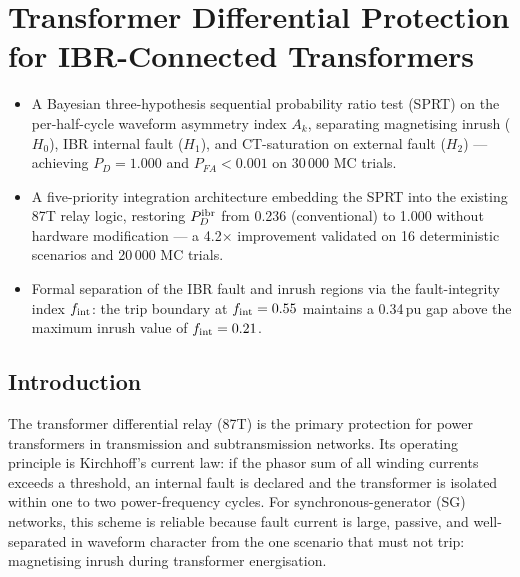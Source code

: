 \chapter{Transformer Differential Protection for IBR-Connected Transformers}
\label{ch:transformer_diff}
\label{ch:distance}%
\label{ch:distance_protection}%

\begin{itemize}
  \item[\textbf{C6.}] A Bayesian three-hypothesis sequential probability ratio
    test (SPRT) on the per-half-cycle waveform asymmetry index $A_k$,
    separating magnetising inrush ($H_0$), IBR internal fault ($H_1$), and
    CT-saturation on external fault ($H_2$) — achieving $P_D = 1.000$ and
    $P_{FA} < 0.001$ on 30\,000 MC trials.

  \item[\textbf{C7.}] A five-priority integration architecture embedding the
    SPRT into the existing 87T relay logic, restoring $P_D^{\rm ibr}$ from
    0.236 (conventional) to 1.000 without hardware modification — a
    4.2$\times$ improvement validated on 16 deterministic scenarios and
    20\,000 MC trials.

  \item[\textbf{C8.}] Formal separation of the IBR fault and inrush regions
    via the fault-integrity index $f_{\rm int}$: the trip boundary at
    $f_{\rm int} = 0.55$ maintains a 0.34\,pu gap above the maximum inrush
    value of $f_{\rm int} = 0.21$.
\end{itemize}

\section{Introduction}
\label{sec:ch5_intro}

The transformer differential relay (87T) is the primary protection for power
transformers in transmission and subtransmission networks.
Its operating principle is Kirchhoff's current law: if the phasor sum of all
winding currents exceeds a threshold, an internal fault is declared and the
transformer is isolated within one to two power-frequency cycles.
For synchronous-generator (SG) networks, this scheme is reliable because fault
current is large, passive, and well-separated in waveform character from the
one scenario that must not trip: magnetising inrush during transformer
energisation.

